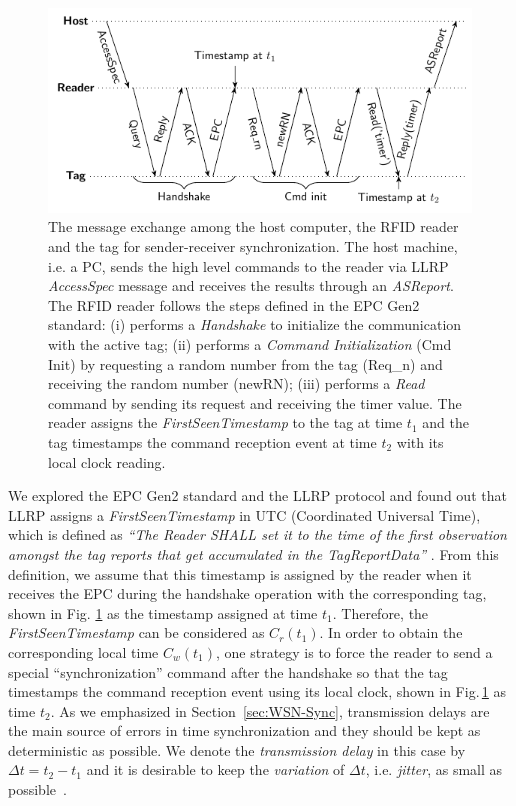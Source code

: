 \documentclass[journal,draftcls,onecolumn,12pt,twoside]{IEEEtranTCOM}
\begin{document}
\begin{figure}
\centering
\includegraphics[scale=0.8]{figures/Sender-Receiver.pdf}
\caption{\label{fig:sender_receiver} The message exchange among the host computer, the RFID reader and the tag for sender-receiver synchronization. The host machine, i.e. a PC,  sends the high level commands to the reader via LLRP \emph{AccessSpec} message and receives the results through an \emph{ASReport}. The RFID reader follows the steps defined in the EPC Gen2 standard: (i) performs a \emph{Handshake} to initialize the communication with the active tag; (ii) performs a \emph{Command Initialization} (Cmd Init) by requesting a random number from the tag (Req\_n) and receiving the random number (newRN); (iii)  performs a \emph{Read} command by sending its request and receiving the timer value. The reader assigns the \emph{FirstSeenTimestamp} to the tag at time $t_1$ and the tag timestamps the command reception event at time $t_2$ with its local clock reading.}
\end{figure}

We explored the EPC Gen2 standard and the LLRP protocol and found out that LLRP assigns a \emph{FirstSeenTimestamp} in UTC (Coordinated Universal Time), which is defined as \emph{``The Reader SHALL set it to the time of the first observation amongst the tag reports that get accumulated in the TagReportData''} \cite[p. 87]{llrp}. From this definition, we assume that this timestamp is assigned by the reader when it receives the EPC during the handshake operation with the corresponding tag, shown in Fig. \ref{fig:sender_receiver} as the timestamp assigned at time $t_1$. Therefore, the \emph{FirstSeenTimestamp} can be considered as $C_r(t_1)$. In order to obtain the corresponding local time $C_w(t_1)$, one strategy is to force the reader to send a special ``synchronization'' command after the handshake so that the tag timestamps the command reception event using its local clock, shown in Fig.\,\ref{fig:sender_receiver} as time $t_2$. As we emphasized in Section~\ref{sec:WSN-Sync}, transmission delays are the main source of errors in time synchronization and they should be kept as deterministic as possible. We denote the \emph{transmission delay} in this case by $\Delta t= t_2-t_1$ and it is desirable to keep the \emph{variation} of $\Delta t$, i.e. \emph{jitter}, as small as possible~\cite{Maroti2004}.
\end{document}

